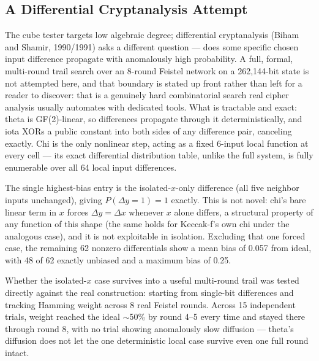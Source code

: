 \documentclass[twocolumn,10pt,journal,compsoc]{IEEEtran}
\begin{document}
\subsection{A Differential Cryptanalysis Attempt}
The cube tester targets low algebraic degree; differential cryptanalysis (Biham and Shamir, 1990/1991) asks a different question --- does some specific chosen input difference propagate with anomalously high probability. A full, formal, multi-round trail search over an 8-round Feistel network on a 262,144-bit state is not attempted here, and that boundary is stated up front rather than left for a reader to discover: that is a genuinely hard combinatorial search real cipher analysis usually automates with dedicated tools. What is tractable and exact: theta is GF(2)-linear, so differences propagate through it deterministically, and iota XORs a public constant into both sides of any difference pair, canceling exactly. Chi is the only nonlinear step, acting as a fixed 6-input local function at every cell --- its exact differential distribution table, unlike the full system, is fully enumerable over all 64 local input differences.

The single highest-bias entry is the isolated-$x$-only difference (all five neighbor inputs unchanged), giving $P(\Delta y{=}1)=1$ exactly. This is not novel: chi's bare linear term in $x$ forces $\Delta y = \Delta x$ whenever $x$ alone differs, a structural property of any function of this shape (the same holds for Keccak-f's own chi under the analogous case), and it is not exploitable in isolation. Excluding that one forced case, the remaining 62 nonzero differentials show a mean bias of 0.057 from ideal, with 48 of 62 exactly unbiased and a maximum bias of 0.25.

Whether the isolated-$x$ case survives into a useful multi-round trail was tested directly against the real construction: starting from single-bit differences and tracking Hamming weight across 8 real Feistel rounds. Across 15 independent trials, weight reached the ideal $\sim$50\% by round 4--5 every time and stayed there through round 8, with no trial showing anomalously slow diffusion --- theta's diffusion does not let the one deterministic local case survive even one full round intact.
\end{document}
